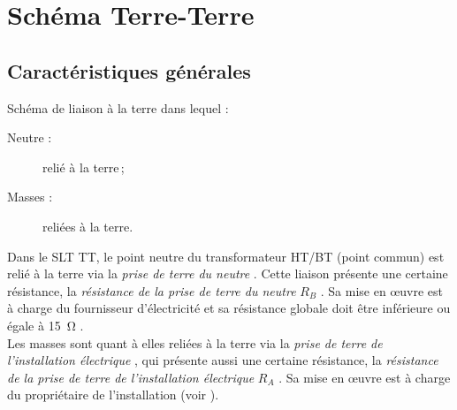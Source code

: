 

\begin{comment}

\documentclass[a4paper, 11pt, twoside, fleqn]{memoir}

\usepackage{AOCDTF}

\marqueurchapitre
\decoupagechapitre{1} %


	\openleft %

\end{comment}

\chapter{Schéma Terre-Terre}
\ChapFrame

\section{Caractéristiques générales}

\begin{definition}[Schéma TT]
Schéma de liaison à la terre dans lequel :
\begin{description}
\item[Neutre :] relié à la terre\,;
\item[Masses :] reliées à la terre.
\end{description}
\end{definition}

Dans le SLT TT, le point neutre du transformateur HT/BT (point commun) est relié à la terre via la \emph{prise de terre du neutre} . Cette liaison présente une certaine résistance, la \emph{résistance de la prise de terre du neutre} $R_B$ . Sa mise en \oe{}uvre est à charge du fournisseur d'électricité et sa résistance globale doit être inférieure ou égale à \SI{15}{\ohm} \supercite{NF:C13-100-2015}.\\
Les masses sont quant à elles reliées à la terre via la \emph{prise de terre de l'installation électrique} , qui présente aussi une certaine résistance, la \emph{résistance de la prise de terre de l'installation électrique} $R_A$ . Sa mise en \oe{}uvre est à charge du propriétaire de l'installation (voir ).\\ 


